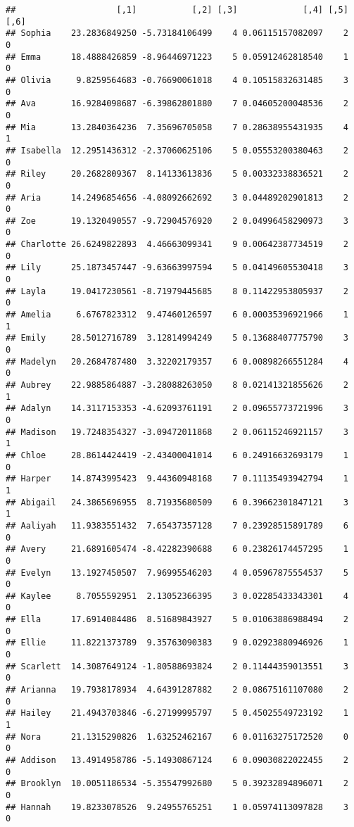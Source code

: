 \documentclass[
]{article}
\begin{document}
\begin{verbatim}
##                    [,1]           [,2] [,3]             [,4] [,5] [,6]
## Sophia    23.2836849250 -5.73184106499    4 0.06115157082097    2    0
## Emma      18.4888426859 -8.96446971223    5 0.05912462818540    1    0
## Olivia     9.8259564683 -0.76690061018    4 0.10515832631485    3    0
## Ava       16.9284098687 -6.39862801880    7 0.04605200048536    2    0
## Mia       13.2840364236  7.35696705058    7 0.28638955431935    4    1
## Isabella  12.2951436312 -2.37060625106    5 0.05553200380463    2    0
## Riley     20.2682809367  8.14133613836    5 0.00332338836521    2    0
## Aria      14.2496854656 -4.08092662692    3 0.04489202901813    2    0
## Zoe       19.1320490557 -9.72904576920    2 0.04996458290973    3    0
## Charlotte 26.6249822893  4.46663099341    9 0.00642387734519    2    0
## Lily      25.1873457447 -9.63663997594    5 0.04149605530418    3    0
## Layla     19.0417230561 -8.71979445685    8 0.11422953805937    2    0
## Amelia     6.6767823312  9.47460126597    6 0.00035396921966    1    1
## Emily     28.5012716789  3.12814994249    5 0.13688407775790    3    0
## Madelyn   20.2684787480  3.32202179357    6 0.00898266551284    4    0
## Aubrey    22.9885864887 -3.28088263050    8 0.02141321855626    2    1
## Adalyn    14.3117153353 -4.62093761191    2 0.09655773721996    3    0
## Madison   19.7248354327 -3.09472011868    2 0.06115246921157    3    1
## Chloe     28.8614424419 -2.43400041014    6 0.24916632693179    1    0
## Harper    14.8743995423  9.44360948168    7 0.11135493942794    1    1
## Abigail   24.3865696955  8.71935680509    6 0.39662301847121    3    1
## Aaliyah   11.9383551432  7.65437357128    7 0.23928515891789    6    0
## Avery     21.6891605474 -8.42282390688    6 0.23826174457295    1    0
## Evelyn    13.1927450507  7.96995546203    4 0.05967875554537    5    0
## Kaylee     8.7055592951  2.13052366395    3 0.02285433343301    4    0
## Ella      17.6914084486  8.51689843927    5 0.01063886988494    2    0
## Ellie     11.8221373789  9.35763090383    9 0.02923880946926    1    0
## Scarlett  14.3087649124 -1.80588693824    2 0.11444359013551    3    0
## Arianna   19.7938178934  4.64391287882    2 0.08675161107080    2    0
## Hailey    21.4943703846 -6.27199995797    5 0.45025549723192    1    1
## Nora      21.1315290826  1.63252462167    6 0.01163275172520    0    0
## Addison   13.4914958786 -5.14930867124    6 0.09030822022455    2    0
## Brooklyn  10.0051186534 -5.35547992680    5 0.39232894896071    2    0
## Hannah    19.8233078526  9.24955765251    1 0.05974113097828    3    0

\end{verbatim}
\end{document}
